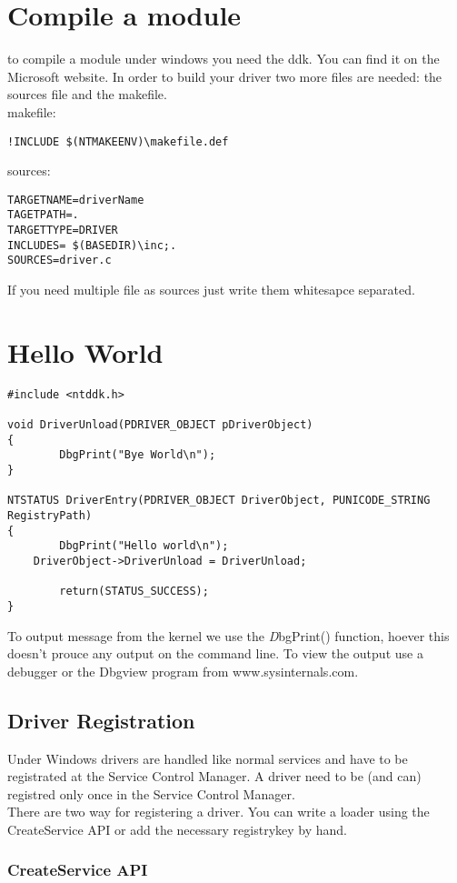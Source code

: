 \documentclass[a4paper,10pt]{article}
\begin{document}
\section{Compile a module}
to compile a module under windows you need the ddk. You can find it on the
Microsoft website.
In order to build your driver two more files are needed: the sources file and
the makefile.\\
makefile:\\
\begin{lstlisting}
!INCLUDE $(NTMAKEENV)\makefile.def
\end{lstlisting}
sources:\\
\begin{lstlisting}
TARGETNAME=driverName
TAGETPATH=.
TARGETTYPE=DRIVER
INCLUDES= $(BASEDIR)\inc;.
SOURCES=driver.c
\end{lstlisting}
If you need multiple file as sources just write them whitesapce separated.

\section{Hello World}
\begin{lstlisting}
#include <ntddk.h>

void DriverUnload(PDRIVER_OBJECT pDriverObject)
{
        DbgPrint("Bye World\n");
}

NTSTATUS DriverEntry(PDRIVER_OBJECT DriverObject, PUNICODE_STRING RegistryPath)
{
        DbgPrint("Hello world\n");
	DriverObject->DriverUnload = DriverUnload;

        return(STATUS_SUCCESS);
}
\end{lstlisting}

To output message from the kernel we use the {\textit DbgPrint()} function, hoever
this doesn't prouce any output on the command line. To view the output use a
debugger or the Dbgview program from www.sysinternals.com.

\subsection{Driver Registration}
Under Windows drivers are handled like normal services and have to be
registrated at the Service Control Manager. A driver need to be (and can)
registred only once in the Service Control Manager.\\
There are two way for registering a driver. You can write a loader using the
CreateService API or add the necessary registrykey by hand.
\subsubsection{CreateService API}
\end{document}
